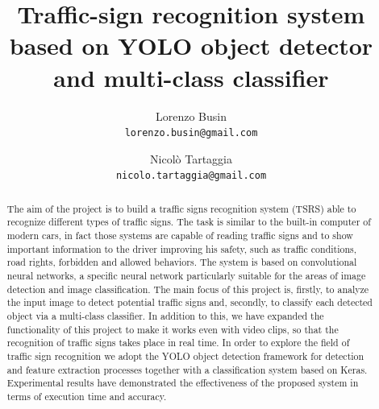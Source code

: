 \documentclass[10pt,twocolumn,letterpaper]{article}
\begin{document}
\title{Traffic-sign recognition system based on YOLO object detector and multi-class classifier}

\author{Lorenzo Busin\\
{\tt\small lorenzo.busin@gmail.com}
\and
Nicolò Tartaggia\\
{\tt\small nicolo.tartaggia@gmail.com}
}

\maketitle

%

\begin{abstract}
	The aim of the project is to build a traffic signs recognition system (TSRS) able to recognize different types of traffic signs. The task is similar to the built-in computer of modern cars, in fact those systems are capable of reading traffic signs and to show important information to the driver improving his safety, such as traffic conditions, road rights, forbidden and allowed behaviors.
	The system is based on convolutional neural networks, a specific neural network particularly suitable for the areas of image detection and image classification.
	The main focus of this project is, firstly, to analyze the input image to detect potential traffic signs and, secondly, to classify each detected object via a multi-class classifier. In addition to this, we have expanded the functionality of this project to make it works even with video clips, so that the recognition of traffic signs takes place in real time. In order to explore the field of traffic sign recognition we adopt the YOLO object detection framework for detection and feature extraction processes together with a classification system based on Keras. Experimental results have demonstrated the effectiveness of the proposed system in terms of execution time and accuracy. 
\end{abstract}
\end{document}
